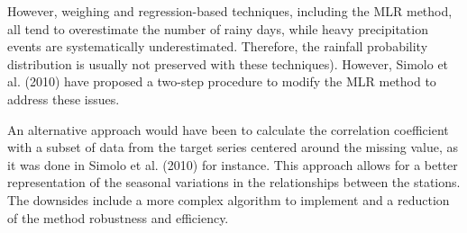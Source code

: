 \documentclass[ARTICLETHERMIC.tex]{subfiles}
\begin{document}
However, weighing and regression-based techniques, including the MLR method, all tend to overestimate the number of rainy days, while heavy precipitation events are systematically underestimated. Therefore, the rainfall probability distribution is usually not preserved with these techniques). However, Simolo et al. (2010) have proposed a two-step procedure to modify the MLR method to address these issues.

An alternative approach would have been to calculate the correlation coefficient with a subset of data from the target series centered around the missing value, as it was done in Simolo et al. (2010) for instance. This approach allows for a better representation of the seasonal variations in the relationships between the stations. The downsides include a more complex algorithm to implement and a reduction of the method robustness and efficiency.
\end{document}
